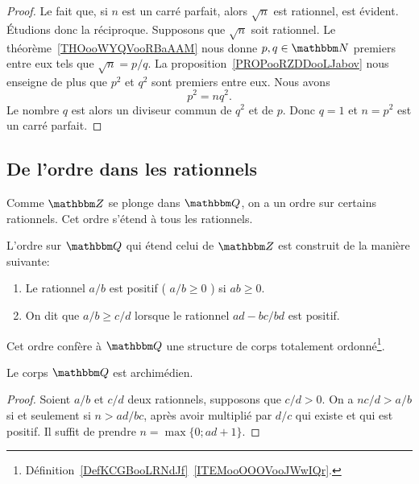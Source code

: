 \begin{proof}
    Le fait que, si \( n \) est un carré parfait, alors \( \sqrt{n} \) est rationnel, est évident. Étudions donc la réciproque.
    Supposons que \( \sqrt{n}\) soit rationnel. Le théorème~\ref{THOooWYQVooRBaAAM} nous donne \( p,q\in \eN\) premiers entre eux tels que \( \sqrt{n}=p/q\). La proposition~\ref{PROPooRZDDooLJabov} nous enseigne de plus que \( p^2\) et \( q^2\) sont premiers entre eux. Nous avons
    \begin{equation}
        p^2=nq^2.
    \end{equation}
    Le nombre $q$ est alors un diviseur commun de \( q^2\) et de \( p\). Donc \( q=1\) et \( n=p^2\) est un carré parfait.
\end{proof}

\subsection{De l'ordre dans les rationnels}
Comme \( \eZ \) se plonge dans \( \eQ \), on a un ordre sur certains rationnels. Cet ordre s'étend à tous les rationnels.
\begin{propositionDef}
  L'ordre sur \( \eQ \) qui étend celui de \( \eZ \) est construit de la manière suivante:
  \begin{enumerate}
  \item Le rationnel \( a/b \) est positif ( \(a/b \geq 0 \) ) si \( ab \geq 0 \). 
  \item On dit que \( a/b \geq c/d \)  lorsque le rationnel \( ad - bc / bd \) est positif. 
  \end{enumerate}
  Cet ordre confère à \(\eQ \) une structure de corps totalement ordonné\footnote{Définition~\ref{DefKCGBooLRNdJf}~\ref{ITEMooOOOVooJWwIQr}.}.
\end{propositionDef}

\begin{lemma} \label{LEMooEBTIooGMoHsj}
  Le corps \( \eQ \) est archimédien.
\end{lemma}
\begin{proof}
  Soient \( a/b \) et \( c/d \) deux rationnels, supposons que \( c/d > 0\). On a \(n c/d > a/b \) si et seulement si \( n > ad / bc \), après avoir multiplié par \( d/c \) qui existe et qui est positif. Il suffit de prendre \(n = \max\{0; ad + 1\}\).
\end{proof}


